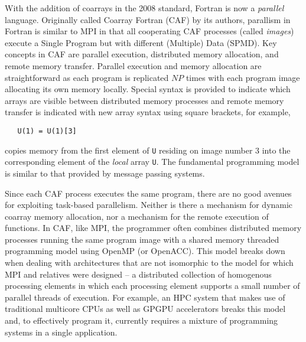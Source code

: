 
With the addition of coarrays in the 2008 standard, Fortran is now a \emph{parallel}
language.  Originally called Coarray Fortran (CAF) by its
authors\cite{Numrich:1998:CFP:289918.289920}, parallism in Fortran is similar to MPI in
that all cooperating CAF processes (called \emph{images}) execute a Single Program but with
different (Multiple) Data (SPMD).  Key concepts in CAF are parallel execution, distributed
memory allocation, and remote memory transfer.  Parallel execution and memory allocation
are straightforward as each program is replicated $NP$ times with each program image
allocating its own memory locally.  Special syntax is provided to indicate which arrays
are visible between distributed memory processes and remote memory transfer is indicated
with new array syntax using square brackets, for example,
\begin{verbatim}
   U(1) = U(1)[3]
\end{verbatim}
copies memory from the first element of \texttt{U} residing on image number 3 into
the corresponding element of the \emph{local} array \texttt{U}.  The fundamental programming
model is similar to that provided by message passing systems.

Since each CAF process executes the same program, there are no good avenues for exploiting
task-based parallelism.  Neither is there a mechanism for dynamic coarray memory
allocation, nor a mechanism for the remote execution of functions.  In CAF, like MPI, the
programmer often combines distributed memory processes running the same program image with a
shared memory threaded programming model using OpenMP (or OpenACC).  This model breaks down
when dealing with architectures that are not isomorphic to the model for which MPI and
relatives were designed -- a distributed collection of homogenous processing elements in
which each processing element supports a small number of parallel threads of execution.  For
example, an HPC system that makes use of traditional multicore CPUs as well as GPGPU accelerators
breaks this model and, to effectively program it, currently requires a mixture of programming
systems in a single application.

